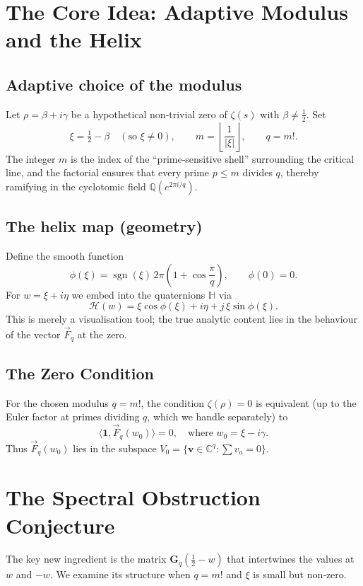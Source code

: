 \documentclass{article}
\theoremstyle{definition}
\begin{document}
\section{The Core Idea: Adaptive Modulus and the Helix}

\subsection{Adaptive choice of the modulus}
Let \(\rho = \beta + i\gamma\) be a hypothetical non‑trivial zero of \(\zeta(s)\) with \(\beta \neq \tfrac12\). Set
\[
\xi = \tfrac12 - \beta \quad (\text{so } \xi \neq 0), \qquad 
m = \left\lfloor \frac{1}{|\xi|} \right\rfloor, \qquad 
q = m!.
\]
The integer \(m\) is the index of the ``prime‑sensitive shell'' surrounding the critical line, and the factorial ensures that every prime \(p \le m\) divides \(q\), thereby ramifying in the cyclotomic field \(\mathbb{Q}(e^{2\pi i / q})\).

\subsection{The helix map (geometry)}
Define the smooth function
\[
\phi(\xi) = \operatorname{sgn}(\xi)\,2\pi\left(1 + \cos\frac{\pi}{q}\right), \qquad \phi(0)=0.
\]
For \(w = \xi + i\eta\) we embed into the quaternions \(\mathbb{H}\) via
\[
\mathcal{H}(w) = \xi\cos\phi(\xi) + i\eta + j\,\xi\sin\phi(\xi).
\]
This is merely a visualisation tool; the true analytic content lies in the behaviour of the vector \(\vec{F}_q\) at the zero.

\subsection{The Zero Condition}
For the chosen modulus \(q = m!\), the condition \(\zeta(\rho)=0\) is equivalent (up to the Euler factor at primes dividing \(q\), which we handle separately) to
\begin{equation}\label{eq:ortho}
\langle \mathbf{1}, \vec{F}_q(w_0) \rangle = 0, \quad \text{where } w_0 = \xi - i\gamma.
\end{equation}
Thus \(\vec{F}_q(w_0)\) lies in the subspace \(V_0 = \{\mathbf{v} \in \mathbb{C}^q : \sum v_a = 0\}\).

\section{The Spectral Obstruction Conjecture}

The key new ingredient is the matrix \(\mathbf{G}_q(\tfrac12 - w)\) that intertwines the values at \(w\) and \(-w\). We examine its structure when \(q = m!\) and \(\xi\) is small but non‑zero. 
\end{document}

